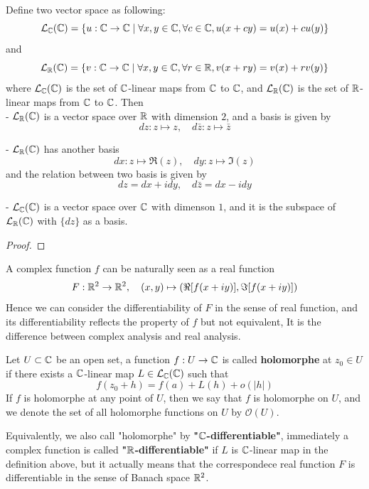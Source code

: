 \documentclass[12pt,a4paper]{article}
\begin{document}
\begin{lemma}
    Define two vector space as following:
    \[\mathcal{L}_{\mathbb{C}}(\mathbb{C}) = \{u: \mathbb{C} \to \mathbb{C} \mid \forall x,y \in \mathbb{C}, \forall c \in \mathbb{C}, u(x+cy) = u(x) + cu(y)\}\]
    and
    \[\mathcal{L}_{\mathbb{R}}(\mathbb{C}) = \{v: \mathbb{C} \to \mathbb{C} \mid \forall x,y \in \mathbb{C}, \forall r \in \mathbb{R}, v(x+ry) = v(x) + rv(y)\}\]
    where \(\mathcal{L}_{\mathbb{C}}(\mathbb{C})\) is the set of \(\mathbb{C}\)-linear maps from \(\mathbb{C}\) to \(\mathbb{C}\), and \(\mathcal{L}_{\mathbb{R}}(\mathbb{C})\) is the set of \(\mathbb{R}\)-linear maps from \(\mathbb{C}\) to \(\mathbb{C}\). Then\\

    - \(\mathcal{L}_{\mathbb{R}}(\mathbb{C})\) is a vector space over \(\mathbb{R}\) with dimension \(2\), and a basis is given by
    \[dz: z \mapsto z , \quad d\bar{z}: z \mapsto \bar{z}\]

    - \(\mathcal{L}_{\mathbb{R}}(\mathbb{C})\) has another basis
    \[dx:z \mapsto \Re(z), \quad dy: z \mapsto \Im(z)\]
    and the relation between two basis is given by
    \[dz = dx + i dy, \quad d\bar{z} = dx - i dy\]

    - \(\mathcal{L}_{\mathbb{C}}(\mathbb{C})\) is a vector space over \(\mathbb{C}\) with dimenson \(1\), and it is the subspace of \(\mathcal{L}_{\mathbb{R}}(\mathbb{C})\) with \(\{dz\}\) as a basis.\\
\end{lemma}
\begin{proof}
    
\end{proof}

A complex function \(f\) can be naturally seen as a real function
\[F: \mathbb{R}^2 \to \mathbb{R}^2, \quad (x,y) \mapsto (\Re[f(x+iy)], \Im[ f(x+iy)])\]
Hence we can consider the differentiability of \(F\) in the sense of real function, and its differentiability reflects the property of \(f\) but not equivalent, It is the difference between complex analysis and real analysis.

\begin{definition}
    Let \(U \subset \mathbb{C}\) be an open set, a function \(f: U \to \mathbb{C}\) is called \textbf{holomorphe} at \(z_0 \in U\) if there exists a \(\mathbb{C}\)-linear map \(L \in \mathcal{L}_{\mathbb{C}}(\mathbb{C})\) such that 
    \[f(z_0+h) = f(a) + L(h) + o(|h|)\]
    If \(f\) is holomorphe at any point of \(U\), then we say that \(f\) is holomorphe on \(U\), and we denote the set of all holomorphe functions on \(U\) by \(\mathcal{O}(U)\).
\end{definition}

Equivalently, we also call "holomorphe" by \textbf{"\(\mathbb{C}\)-differentiable"}, immediately a complex function is called \textbf{"\(\mathbb{R}\)-differentiable"} if \(L\) is \(\mathbb{C}\)-linear map in the definition above, but it actually means that the correspondece real function \(F\) is differentiable in the sense of Banach space \(\mathbb{R}^2\). 
\end{document}
